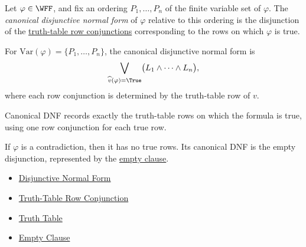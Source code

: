 \begin{tcolorbox}[colback=propbox, colframe=propborder, arc=2pt, left=6pt, right=6pt, top=4pt, bottom=4pt, title={\small\textbf{Definition (Canonical Disjunctive Normal Form)}}]
\begin{definition}
\label{def:canonical-disjunctive-normal-form-propositional-logic}
Let \(\varphi\in\WFF\), and fix an ordering \(P_1,\ldots,P_n\) of the finite
variable set of \(\varphi\). The \emph{canonical disjunctive normal form} of
\(\varphi\) relative to this ordering is the disjunction of the
\hyperref[def:truth-table-row-conjunction-propositional-logic]{truth-table row conjunctions}
corresponding to the rows on which \(\varphi\) is true.
\end{definition}
\end{tcolorbox}

\begin{remark*}
For \(\mathrm{Var}(\varphi)=\{P_1,\ldots,P_n\}\), the canonical
disjunctive normal form is
\[
\bigvee_{\widehat v(\varphi)=\True}
\bigl(L_1\land\cdots\land L_n\bigr),
\]
where each row conjunction is determined by the truth-table row of \(v\).
\end{remark*}

\begin{remark*}[Interpretation]
Canonical DNF records exactly the truth-table rows on which the formula is
true, using one row conjunction for each true row.
\end{remark*}

\begin{remark*}[Examples]
If \(\varphi\) is a contradiction, then it has no true rows. Its canonical DNF
is the empty disjunction, represented by the
\hyperref[def:empty-clause-propositional-logic]{empty clause}.
\end{remark*}

\begin{dependencies}
\begin{itemize}
  \item \hyperref[def:disjunctive-normal-form-propositional-logic]{Disjunctive Normal Form}
  \item \hyperref[def:truth-table-row-conjunction-propositional-logic]{Truth-Table Row Conjunction}
  \item \hyperref[def:truth-table-propositional-logic]{Truth Table}
  \item \hyperref[def:empty-clause-propositional-logic]{Empty Clause}
\end{itemize}
\end{dependencies}

